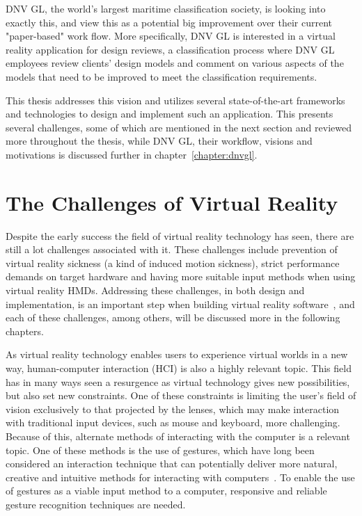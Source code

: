 DNV GL, the world's largest maritime classification society, is looking into exactly this, and view this as a potential big improvement over their current 
"paper-based" work flow. More specifically, DNV GL is interested in a virtual reality application for design reviews, a classification process where DNV GL employees review 
clients' design models and comment on various aspects of the models that need to be improved to meet the classification requirements. 

This thesis addresses this vision and utilizes several state-of-the-art frameworks and technologies to design and implement such 
an application. This presents several challenges, some of which are mentioned in the next section and reviewed more throughout the thesis, while 
DNV GL, their workflow, visions and motivations is discussed further in chapter~\ref{chapter:dnvgl}. 


\section{The Challenges of Virtual Reality} 
Despite the early success the field of virtual reality technology has seen, there are still a lot challenges associated with it. 
These challenges include prevention of virtual reality sickness (a kind of induced motion sickness), 
strict performance demands on target hardware and having more suitable input methods when using virtual reality HMDs. %
Addressing these challenges, in both design and implementation, is an important step when building virtual reality software~\citep{OCULUS2016}, 
and each of these challenges, among others, will be discussed more in the following chapters.

As virtual reality technology enables users to experience virtual worlds in a new way, 
human-computer interaction (HCI) is also a highly relevant topic. 
This field has in many ways seen a resurgence as virtual technology gives new possibilities, but also set new constraints. 
One of these constraints is limiting the user's field of vision exclusively to that projected by the lenses, 
which may make interaction with traditional input devices, such as mouse and keyboard, more challenging. 
Because of this, alternate methods of interacting with the computer is a relevant topic. 
One of these methods is the use of gestures, 
which have long been considered an interaction technique that can potentially deliver more natural, 
creative and intuitive methods for interacting with computers~\citep{Rautaray2015}. 
To enable the use of gestures as a viable input method to a computer, responsive and reliable gesture recognition techniques are needed.  

